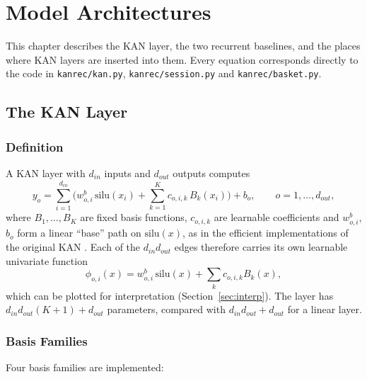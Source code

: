 \chapter{Model Architectures}
\label{ch:models}

This chapter describes the KAN layer, the two recurrent baselines, and the
places where KAN layers are inserted into them. Every equation corresponds
directly to the code in \texttt{kanrec/kan.py}, \texttt{kanrec/session.py} and
\texttt{kanrec/basket.py}.

\section{The KAN Layer}

\subsection{Definition}

A KAN layer with $d_{in}$ inputs and $d_{out}$ outputs computes
\begin{equation}
y_o = \sum_{i=1}^{d_{in}} \Big( w^{b}_{o,i}\, \mathrm{silu}(x_i) + \sum_{k=1}^{K} c_{o,i,k}\, B_k(x_i) \Big) + b_o,
\qquad o = 1, \ldots, d_{out},
\label{eq:kan}
\end{equation}
where $B_1, \ldots, B_K$ are fixed basis functions, $c_{o,i,k}$ are learnable
coefficients and $w^b_{o,i}$, $b_o$ form a linear ``base'' path on
$\mathrm{silu}(x)$, as in the efficient implementations of the original KAN
\cite{liu2025kan}. Each of the $d_{in} d_{out}$ edges therefore carries its own
learnable univariate function
\begin{equation}
\phi_{o,i}(x) = w^b_{o,i}\,\mathrm{silu}(x) + \sum_{k} c_{o,i,k} B_k(x),
\end{equation}
which can be plotted for interpretation (Section~\ref{sec:interp}). The layer
has $d_{in} d_{out} (K + 1) + d_{out}$ parameters, compared with
$d_{in} d_{out} + d_{out}$ for a linear layer.

\subsection{Basis Families}

Four basis families are implemented:

